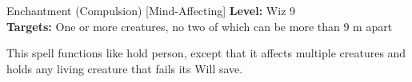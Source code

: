 {Enchantment (Compulsion) [Mind-Affecting]}
{
	\textbf{Level:}
	Wiz 9\\
	\textbf{Targets:}
	One or more creatures, no two of which can be more than 9 m apart\\
}
{
	This spell functions like hold person, except that it affects multiple creatures and holds any living creature that fails its Will save.

}
